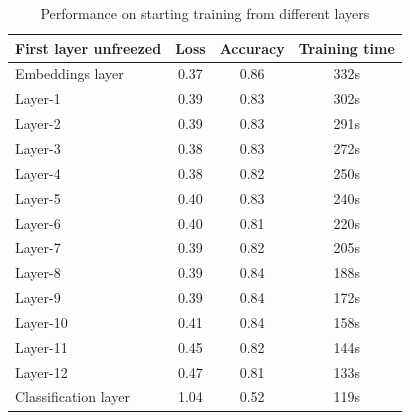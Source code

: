 \documentclass[../main.tex]{subfiles}
\begin{document}
\begin{table}
  \caption{Performance on starting training from different layers}
  \label{tab:unfreezed}
  \begin{tabular}{lccc}
    \toprule
    First layer unfreezed  &  Loss &  Accuracy &  Training time\\
    \midrule
    Embeddings layer & 0.37 & 0.86 & 332s \\
    Layer-1 &      0.39 & 0.83 & 302s \\
    Layer-2 &      0.39 & 0.83 & 291s \\
    Layer-3 &      0.38 & 0.83 & 272s \\
    Layer-4 &      0.38 & 0.82 & 250s \\
    Layer-5 &      0.40 & 0.83 & 240s \\
    Layer-6 &      0.40 & 0.81 & 220s \\
    Layer-7 &      0.39 & 0.82 & 205s \\
    Layer-8 &      0.39 & 0.84 & 188s \\
    Layer-9 &      0.39 & 0.84 & 172s \\
    Layer-10 &      0.41 & 0.84 & 158s \\
    Layer-11 &      0.45 & 0.82 & 144s \\
    Layer-12 &      0.47 & 0.81 & 133s \\
    Classification layer & 1.04 & 0.52 & 119s \\
  \bottomrule
\end{tabular}
\end{table}
\end{document}
